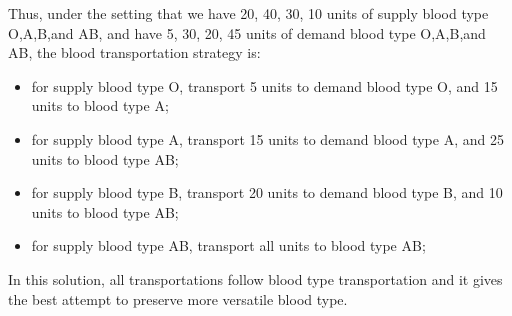 Thus, under the setting that we have 20, 40, 30, 10 units of supply blood type O,A,B,and AB, and have 5, 30, 20, 45 units of demand blood type O,A,B,and AB, the blood transportation strategy is: 
\begin{itemize}
\item for supply blood type O, transport 5 units to demand blood type O, and 15 units to blood type A;
\item for supply blood type A, transport 15 units to demand blood type A, and 25 units to blood type AB;
\item for supply blood type B, transport 20 units to demand blood type B, and 10 units to blood type AB;
\item for supply blood type AB, transport all units to blood type AB;
\end{itemize}
In this solution, all transportations follow blood type transportation and it gives the best attempt to preserve more versatile blood type.